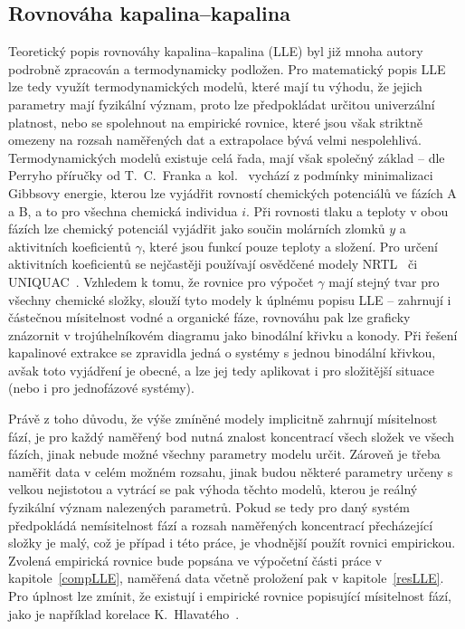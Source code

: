 \subsection{Rovnováha kapalina--kapalina} \label{LLEtheory}
Teoretický popis rovnováhy kapalina--kapalina (LLE) byl již mnoha autory podrobně zpracován a termodynamicky podložen.
Pro matematický popis LLE lze tedy využít termodynamických modelů, které mají tu výhodu, že jejich parametry mají fyzikální význam, proto lze předpokládat určitou univerzální platnost, nebo se spolehnout na empirické rovnice, které jsou však striktně omezeny na rozsah naměřených dat a extrapolace bývá velmi nespolehlivá.
Termodynamických modelů existuje celá řada, mají však společný základ -- dle Perryho příručky od T.~C.~Franka a~kol.~\cite{Perry_15} vychází z podmínky minimalizaci Gibbsovy energie, kterou lze vyjádřit rovností chemických potenciálů ve fázích A a B, a to pro všechna chemická individua $i$.
Při rovnosti tlaku a teploty v obou fázích lze chemický potenciál vyjádřit jako součin molárních zlomků $y$ a aktivitních koeficientů $\gamma$, které jsou funkcí pouze teploty a složení.
Pro určení aktivitních koeficientů se nejčastěji používají osvědčené modely NRTL~\cite{NRTL} či UNIQUAC~\cite{UNIQUAC}.
Vzhledem k tomu, že rovnice pro výpočet $\gamma$ mají stejný tvar pro všechny chemické složky, slouží tyto modely k úplnému popisu LLE -- zahrnují i částečnou mísitelnost vodné a organické fáze, rovnováhu pak lze graficky znázornit v trojúhelníkovém diagramu jako binodální křivku a konody.
Při řešení kapalinové extrakce se zpravidla jedná o systémy s jednou binodální křivkou, avšak toto vyjádření je obecné, a lze jej tedy aplikovat i pro složitější situace (nebo i pro jednofázové systémy).

Právě z toho důvodu, že výše zmíněné modely implicitně zahrnují mísitelnost fází, je pro každý naměřený bod nutná znalost koncentrací všech složek ve všech fázích, jinak nebude možné všechny parametry modelu určit.
Zároveň je třeba naměřit data v celém možném rozsahu, jinak budou některé parametry určeny s velkou nejistotou a vytrácí se pak výhoda těchto modelů, kterou je reálný fyzikální význam nalezených parametrů.
Pokud se tedy pro daný systém předpokládá nemísitelnost fází a rozsah naměřených koncentrací přecházející složky je malý, což je případ i této práce, je vhodnější použít rovnici empirickou.
Zvolená empirická rovnice bude popsána ve výpočetní části práce v kapitole~\ref{compLLE}, naměřená data včetně proložení pak v kapitole~\ref{resLLE}.
Pro úplnost lze zmínit, že existují i empirické rovnice popisující mísitelnost fází, jako je například korelace K.~Hlavatého~\cite{Hlavaty1972}.
